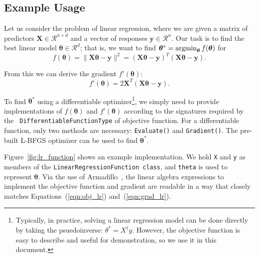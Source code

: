 \subsection{Example Usage}
\label{sec:linreg_example}

Let us consider the problem of linear regression, where we are
given a matrix of predictors $\bm X \in \mathcal{R}^{n \times d}$ and a vector
of responses $\bm y \in \mathcal{R}^n$.  Our task is to find the best linear
model $\bm \theta \in \mathcal{R}^d$; that is, we want to find
$\bm \theta^* = \operatornamewithlimits{argmin}_{\bm\theta} f(\bm \theta)$ for
%
\begin{equation}
f(\bm \theta) = \| \bm X \bm \theta - \bm y \|^2 = (\bm X \bm \theta - \bm y)^T
(\bm X \bm \theta - \bm y).
\label{eqn:obj_lr}
\end{equation}

\noindent
From this we can derive the gradient $f'(\bm \theta)$:
%
\begin{equation}
f'(\bm \theta) = 2 \bm X^T (\bm X \bm \theta - \bm y).
\label{eqn:grad_lr}
\end{equation}

To find $\bm \theta^*$ using a differentiable
optimizer\footnote{Typically, in practice, solving a linear regression model can
be done directly by taking the psuedoinverse: $\theta^* = X^\dagger y$.  However,
the objective function is easy to describe and useful for demonstration, so we
use it in this document.}, we simply need to provide implementations of $f(\bm \theta)$ and
$f'(\bm \theta)$ according to the signatures required by the {\tt
DifferentiableFunctionType} of objective function.  For a differentiable
function, only two methods are necessary: {\tt Evaluate()} and {\tt Gradient()}.
The pre-built L-BFGS optimizer can be used to find $\bm \theta^*$.

Figure~\ref{fig:lr_function} shows an example implementation.
We hold {\tt X} and {\tt y} as members of the
{\tt LinearRegressionFunction class},
and {\tt theta} is used to represent $\bm \theta$.
Via the use of Armadillo~\cite{sanderson2016armadillo},
the linear algebra expressions to implement the objective function and gradient
are readable in a way that closely matches Equations~(\ref{eqn:obj_lr}) and~(\ref{eqn:grad_lr}).






